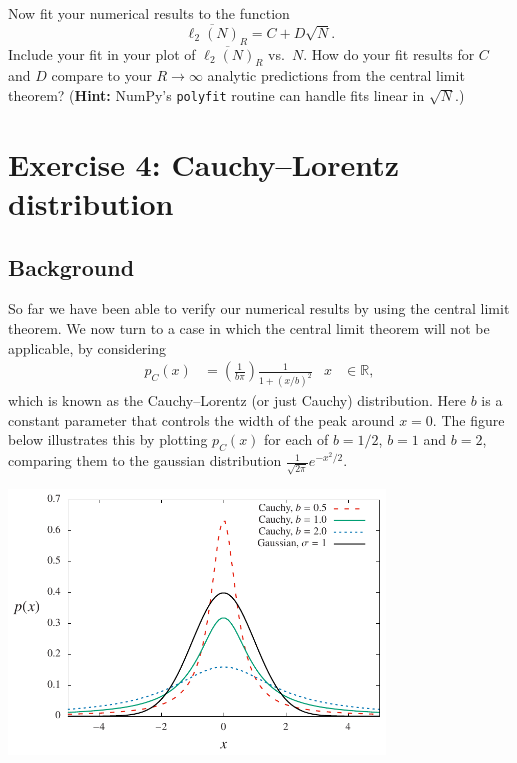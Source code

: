 \documentclass[12 pt]{article} %
\newcommand{\Rbb}{\ensuremath{\mathbb R} }
\newcommand{\showmarks}[1]{\rightline{\texttt{[#1 marks]}}} %
\begin{document}
\showmarks{6}

Now fit your numerical results to the function
\begin{equation*}
  \overline{\ell_2(N)}_R = C + D \sqrt{N}.
\end{equation*}
Include your fit in your plot of $\overline{\ell_2(N)}_R$ vs.\ $N$.
How do your fit results for $C$ and $D$ compare to your $R \to \infty$ analytic predictions from the central limit theorem?
(\textbf{Hint:} NumPy's \texttt{polyfit} routine can handle fits linear in $\sqrt{N}$.)

\showmarks{4}



\newpage %
\section*{Exercise 4: Cauchy--Lorentz distribution}
\subsection*{Background}
So far we have been able to verify our numerical results by using the central limit theorem.
We now turn to a case in which the central limit theorem will not be applicable, by considering
\begin{align}
  \label{eq:cauchy}
  p_C(x) & = \left(\frac{1}{b \pi}\right) \frac{1}{1 + (x / b)^2} &
  x & \in \Rbb,
\end{align}
which is known as the Cauchy--Lorentz (or just Cauchy) distribution.
Here $b$ is a constant parameter that controls the width of the peak around $x = 0$.
The figure below illustrates this by plotting $p_C(x)$ for each of $b = 1 / 2$, $b = 1$ and $b = 2$, comparing them to the gaussian distribution $\displaystyle \frac{1}{\sqrt{2\pi}} e^{-x^2 / 2}$.

\begin{center}\includegraphics[width=0.75\textwidth]{figs/cauchy.pdf}\end{center}
\end{document}
